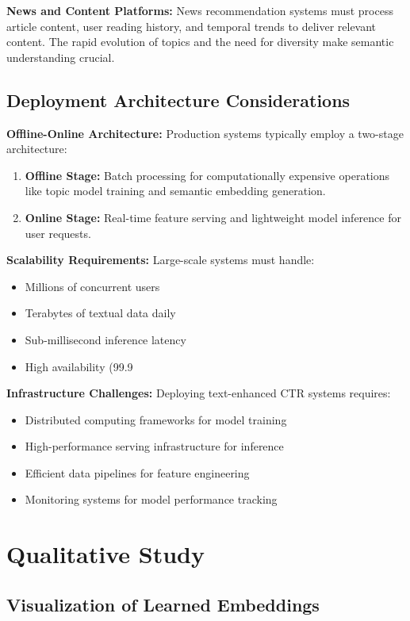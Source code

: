 \textbf{News and Content Platforms:} News recommendation systems must process article content, user reading history, and temporal trends to deliver relevant content. The rapid evolution of topics and the need for diversity make semantic understanding crucial.

\subsection{Deployment Architecture Considerations}

\textbf{Offline-Online Architecture:} Production systems typically employ a two-stage architecture:
\begin{enumerate}
    \item \textbf{Offline Stage:} Batch processing for computationally expensive operations like topic model training and semantic embedding generation.
    \item \textbf{Online Stage:} Real-time feature serving and lightweight model inference for user requests.
\end{enumerate}

\textbf{Scalability Requirements:} Large-scale systems must handle:
\begin{itemize}
    \item Millions of concurrent users
    \item Terabytes of textual data daily
    \item Sub-millisecond inference latency
    \item High availability (99.9%
\end{itemize}

\textbf{Infrastructure Challenges:} Deploying text-enhanced CTR systems requires:
\begin{itemize}
    \item Distributed computing frameworks for model training
    \item High-performance serving infrastructure for inference
    \item Efficient data pipelines for feature engineering
    \item Monitoring systems for model performance tracking
\end{itemize}

\section{Qualitative Study}

\subsection{Visualization of Learned Embeddings}


